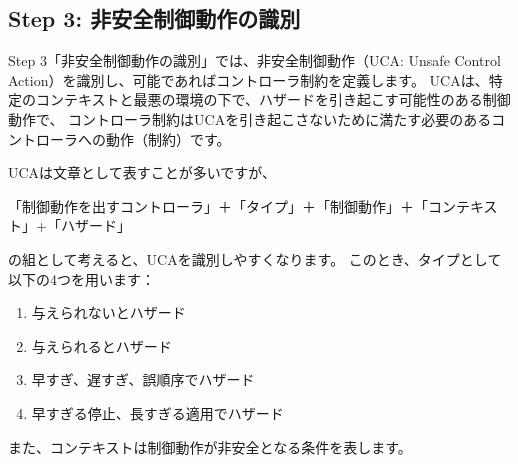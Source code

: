 \subsection{Step 3: 非安全制御動作の識別}

Step 3「非安全制御動作の識別」では、非安全制御動作（UCA: Unsafe Control Action）を識別し、可能であればコントローラ制約を定義します。
UCAは、特定のコンテキストと最悪の環境の下で、ハザードを引き起こす可能性のある制御動作で、
コントローラ制約はUCAを引き起こさないために満たす必要のあるコントローラへの動作（制約）です。

UCAは文章として表すことが多いですが、

「制御動作を出すコントローラ」＋「タイプ」＋「制御動作」＋「コンテキスト」+「ハザード」

の組として考えると、UCAを識別しやすくなります。
このとき、タイプとして以下の4つを用います：
%
\begin{enumerate}
    \item 与えられないとハザード
    \item 与えられるとハザード
    \item 早すぎ、遅すぎ、誤順序でハザード
    \item 早すぎる停止、長すぎる適用でハザード
\end{enumerate}
また、コンテキストは制御動作が非安全となる条件を表します。

